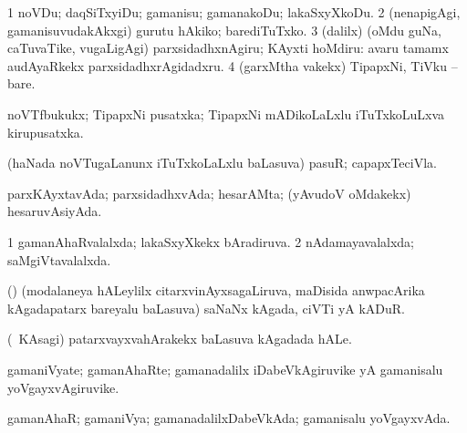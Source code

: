 \bentry
{}
\gl{\sakirx}
\bmng
\bnum
\num{1} noVDu; daqSiTxyiDu; gamanisu; gamanakoDu; lakaSxyXkoDu. 
\num{2} (nenapigAgi, gamanisuvudakAkxgi) gurutu hAkiko; barediTuTxko. 
\num{3} (\kaparx dalilx) (oMdu guNa, caTuvaTike, \mo vugaLigAgi) parxsidadhxnAgiru; KAyxti hoMdiru:  avaru tamamx audAyaRkekx parxsidadhxrAgidadxru. 
\num{4} (garxMtha \mo vakekx) TipapxNi, TiVku -- bare. 
\enum
\emng
\eentry

\bentry
{}
\gl{\nA}
\bmng
noVTfbukukx; TipapxNi pusatxka; TipapxNi mADikoLaLxlu iTuTxkoLuLxva kirupusatxka. 
\emng
\eentry

\bentry
{}
\gl{\nA}
\bmng
(haNada noVTugaLanunx iTuTxkoLaLxlu baLasuva) pasuR; capapxTeciVla. 
\emng
\eentry

\bentry
{}
\gl{\gu}
\bmng
parxKAyxtavAda; parxsidadhxvAda; hesarAMta; (yAvudoV oMdakekx) hesaruvAsiyAda. 
\emng
\eentry

\bentry
{}
\gl{\gu}
\bmng
\bnum
\num{1} gamanAhaRvalalxda; lakaSxyXkekx bAradiruva. 
\num{2} nAdamayavalalxda; saMgiVtavalalxda. 
\enum
\emng
\eentry

\bentry 
{}
\gl{\nA}
\bmng
(\kanmu) (modalaneya hALeylilx citarxvinAyxsagaLiruva, maDisida anwpacArika kAgadapatarx bareyalu baLasuva) saNaNx kAgada, ciVTi yA kADuR. 
\emng
\eentry

\bentry 
{}
\gl{\nA}
\bmng
(\kanmu\ KAsagi) patarxvayxvahArakekx baLasuva kAgadada hALe. 
\emng
\eentry

\bentry 
{}
\gl{\nA}
\bmng
gamaniVyate; gamanAhaRte; gamanadalilx iDabeVkAgiruvike yA gamanisalu yoVgayxvAgiruvike. 
\emng
\eentry

\bentry 
{}
\gl{\gu}
\bmng
gamanAhaR; gamaniVya; gamanadalilxDabeVkAda; gamanisalu yoVgayxvAda. 
\emng
\eentry

